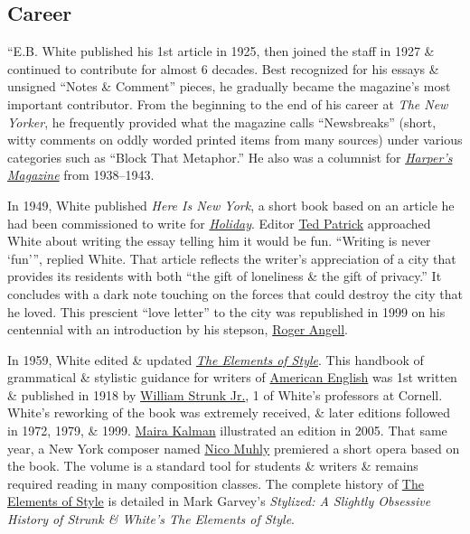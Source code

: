 \documentclass[oneside]{book}
\numberwithin{equation}{section}
\begin{document}
\subsection{Career}
``E.B. White published his 1st article in 1925, then joined the staff in 1927 \& continued to contribute for almost 6 decades. Best recognized for his essays \& unsigned ``Notes \& Comment'' pieces, he gradually became the magazine's most important contributor. From the beginning to the end of his career at \textit{The New Yorker}, he frequently provided what the magazine calls ``Newsbreaks'' (short, witty comments on oddly worded printed items from many sources) under various categories such as ``Block That Metaphor.'' He also was a columnist for \href{https://en.wikipedia.org/wiki/Harper%27s_Magazine}{\textit{Harper's Magazine}} from 1938--1943.

In 1949, White published \textit{Here Is New York}, a short book based on an article he had been commissioned to write for \href{https://en.wikipedia.org/wiki/Holiday_(magazine)}{\textit{Holiday}}. Editor \href{https://en.wikipedia.org/wiki/Ted_Patrick_(editor)}{Ted Patrick} approached White about writing the essay telling him it would be fun. ``Writing is never `fun''', replied White. That article reflects the writer's appreciation of a city that provides its residents with both ``the gift of loneliness \& the gift of privacy.'' It concludes with a dark note touching on the forces that could destroy the city that he loved. This prescient ``love letter'' to the city was republished in 1999 on his centennial with an introduction by his stepson, \href{https://en.wikipedia.org/wiki/Roger_Angell}{Roger Angell}.

In 1959, White edited \& updated \href{https://en.wikipedia.org/wiki/The_Elements_of_Style}{\textit{The Elements of Style}}. This handbook of grammatical \& stylistic guidance for writers of \href{https://en.wikipedia.org/wiki/American_English}{American English} was 1st written \& published in 1918 by \href{https://en.wikipedia.org/wiki/William_Strunk_Jr.}{William Strunk Jr.}, 1 of White's professors at Cornell. White's reworking of the book was extremely received, \& later editions followed in 1972, 1979, \& 1999. \href{https://en.wikipedia.org/wiki/Maira_Kalman}{Maira Kalman} illustrated an edition in 2005. That same year, a New York composer named \href{https://en.wikipedia.org/wiki/Nico_Muhly}{Nico Muhly} premiered a short opera based on the book. The volume is a standard tool for students \& writers \& remains required reading in many composition classes. The complete history of \href{https://en.wikipedia.org/wiki/The_Elements_of_Style}{The Elements of Style} is detailed in Mark Garvey's \textit{Stylized: A Slightly Obsessive History of Strunk \& White's The Elements of Style}.
\end{document}
